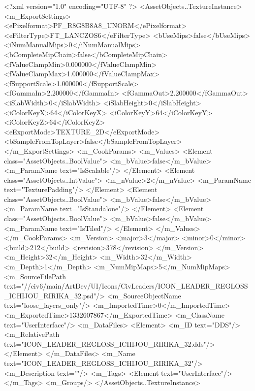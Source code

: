 <?xml version="1.0" encoding="UTF-8" ?>
<AssetObjects..TextureInstance>
	<m_ExportSettings>
		<ePixelformat>PF_R8G8B8A8_UNORM</ePixelformat>
		<eFilterType>FT_LANCZOS6</eFilterType>
		<bUseMips>false</bUseMips>
		<iNumManualMips>0</iNumManualMips>
		<bCompleteMipChain>false</bCompleteMipChain>
		<fValueClampMin>0.000000</fValueClampMin>
		<fValueClampMax>1.000000</fValueClampMax>
		<fSupportScale>1.000000</fSupportScale>
		<fGammaIn>2.200000</fGammaIn>
		<fGammaOut>2.200000</fGammaOut>
		<iSlabWidth>0</iSlabWidth>
		<iSlabHeight>0</iSlabHeight>
		<iColorKeyX>64</iColorKeyX>
		<iColorKeyY>64</iColorKeyY>
		<iColorKeyZ>64</iColorKeyZ>
		<eExportMode>TEXTURE_2D</eExportMode>
		<bSampleFromTopLayer>false</bSampleFromTopLayer>
	</m_ExportSettings>
	<m_CookParams>
		<m_Values>
			<Element class="AssetObjects..BoolValue">
				<m_bValue>false</m_bValue>
				<m_ParamName text="IsScalable"/>
			</Element>
			<Element class="AssetObjects..IntValue">
				<m_nValue>2</m_nValue>
				<m_ParamName text="TexturePadding"/>
			</Element>
			<Element class="AssetObjects..BoolValue">
				<m_bValue>false</m_bValue>
				<m_ParamName text="IsStandalone"/>
			</Element>
			<Element class="AssetObjects..BoolValue">
				<m_bValue>false</m_bValue>
				<m_ParamName text="IsTiled"/>
			</Element>
		</m_Values>
	</m_CookParams>
	<m_Version>
		<major>3</major>
		<minor>0</minor>
		<build>212</build>
		<revision>378</revision>
	</m_Version>
	<m_Height>32</m_Height>
	<m_Width>32</m_Width>
	<m_Depth>1</m_Depth>
	<m_NumMipMaps>5</m_NumMipMaps>
	<m_SourceFilePath text="//civ6/main/ArtDev/UI/Icons/CivLeaders/ICON_LEADER_REGLOSS_ICHIJOU_RIRIKA_32.psd"/>
	<m_SourceObjectName text="loose_layers_only"/>
	<m_ImportedTime>0</m_ImportedTime>
	<m_ExportedTime>1332607867</m_ExportedTime>
	<m_ClassName text="UserInterface"/>
	<m_DataFiles>
		<Element>
			<m_ID text="DDS"/>
			<m_RelativePath text="ICON_LEADER_REGLOSS_ICHIJOU_RIRIKA_32.dds"/>
		</Element>
	</m_DataFiles>
	<m_Name text="ICON_LEADER_REGLOSS_ICHIJOU_RIRIKA_32"/>
	<m_Description text=""/>
	<m_Tags>
		<Element text="UserInterface"/>
	</m_Tags>
	<m_Groups/>
</AssetObjects..TextureInstance>

